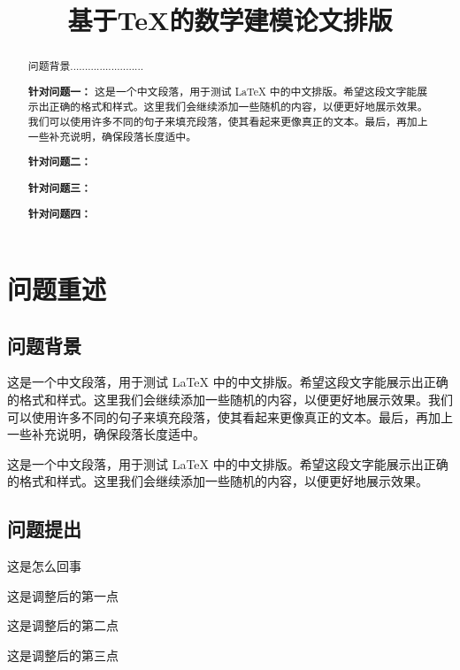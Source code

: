 \documentclass{cumcmthesis} %
\title{基于{\TeX{}}的数学建模论文排版}
\begin{document}
\maketitle

\begin{abstract}

    问题背景.........................

    \textbf{针对问题一：}
    这是一个中文段落，用于测试 LaTeX 中的中文排版。希望这段文字能展示出正确的格式和样式。这里我们会继续添加一些随机的内容，以便更好地展示效果。我们可以使用许多不同的句子来填充段落，使其看起来更像真正的文本。最后，再加上一些补充说明，确保段落长度适中。

    \textbf{针对问题二：}

    \textbf{针对问题三：}

    \textbf{针对问题四：}

    

\end{abstract}

\newpage
\section{问题重述}

\subsection{问题背景}

这是一个中文段落，用于测试 LaTeX 中的中文排版。希望这段文字能展示出正确的格式和样式。这里我们会继续添加一些随机的内容，以便更好地展示效果。我们可以使用许多不同的句子来填充段落，使其看起来更像真正的文本。最后，再加上一些补充说明，确保段落长度适中。

这是一个中文段落，用于测试 LaTeX 中的中文排版。希望这段文字能展示出正确的格式和样式。这里我们会继续添加一些随机的内容，以便更好地展示效果。

\subsection{问题提出}

这是怎么回事

\begin{list}{1.}{\setlength{\leftmargin}{2em}\setlength{\itemsep}{0pt}}
    \item 这是调整后的第一点
    \item 这是调整后的第二点
    \item 这是调整后的第三点
\end{list}
\end{document}
